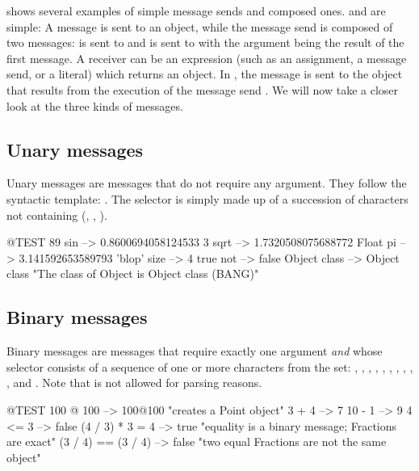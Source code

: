 \documentclass[a4paper,10pt,twoside]{book}
\begin{document}
 shows several examples of simple message sends and composed ones.
 and  are simple:
A message is sent to an object, while the message send  is composed of two messages:
 is sent to  and  is sent to  with the argument being the result of the first message.
A receiver can be an expression (such as an assignment, a message send, or a literal) which returns an object.
In , the message  is sent to the object that results from the execution of the message send .
We will now take a closer look at the three kinds of messages.

\subsection{Unary messages}
Unary messages are messages that do not require any argument.
They follow the syntactic template: .
The selector is simply made up of a succession of characters not containing \ct{:} (\eg {}, , ).
\begin{code}{@TEST}
89 sin           --> 0.8600694058124533
3 sqrt           --> 1.7320508075688772
Float pi         --> 3.141592653589793
'blop' size     --> 4
true not        --> false
Object class --> Object class  "The class of Object is Object class (BANG)"
\end{code}


\subsection{Binary messages}
Binary messages are messages that require exactly one argument \emph{and} whose selector consists of a sequence of one or more characters from the set: \ct{+}, \ct{-}, \ct{*}, \ct{/}, \ct{&}, \ct{=}, \ct{>}, \ct{|}, \ct{<}, \ct{~}, and .
Note that \ct{--} is not allowed for parsing reasons.

\begin{code}{@TEST}
100 @ 100      --> 100@100  "creates a Point object"
3 + 4              --> 7
10 - 1            --> 9
4 <= 3            --> false
(4 / 3) * 3 = 4   --> true  "equality is a binary message; Fractions are exact"
(3 / 4) == (3 / 4) --> false  "two equal Fractions are not the same object"
\end{code}
\end{document}
